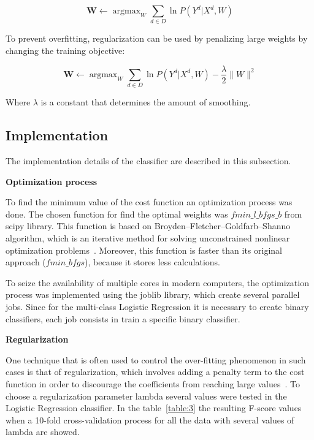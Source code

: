 \documentclass[letterpaper,10pt]{article}
\DeclareMathOperator*{\argmax}{argmax}
\theoremstyle{mytheor}
\begin{document}
\begin{equation}
\boldsymbol{W} \leftarrow \argmax_{W} \sum_{d \in D} \ln P(Y^d|X^d, W)
\end{equation}

To prevent overfitting, regularization can be used by penalizing large weights by changing the training objective:

\begin{equation}
\boldsymbol{W} \leftarrow \argmax_{W} \sum_{d \in D} \ln P(Y^d|X^d, W) - \frac{\lambda}{2}\parallel W \parallel^2 
\end{equation}

Where $\lambda$ is a constant that determines the amount of smoothing. 

\subsection{Implementation}

The implementation details of the classifier are described in this subsection.

\textbf{Optimization process}

To find the minimum value of the cost function an optimization process was done. The chosen function for find the optimal weights was $fmin\_l\_bfgs\_b$ from scipy library. This function is based on Broyden–Fletcher–Goldfarb–Shanno algorithm, which is an iterative method for solving unconstrained nonlinear optimization problems~\cite{wiki:bfgs}. Moreover, this function is faster than its original approach ($fmin\_bfgs$), because it stores less calculations. 

To seize the availability of multiple cores in modern computers, the optimization process was implemented using the joblib library, which create several parallel jobs. Since for the multi-class Logistic Regression it is necessary to create binary classifiers, each job consists in train a specific binary classifier.

\textbf{Regularization} 

One technique that is often used to control the over-fitting phenomenon in such cases is that of regularization, which involves adding a penalty term to the cost function in order to discourage the coefficients from reaching large values~\cite{bishop2007pattern}.
To choose a regularization parameter lambda several values were tested in the Logistic Regression classifier. In the table~\ref{table:3} the resulting F-score values when a 10-fold cross-validation process for all the data with several values of lambda are showed.
\end{document}
